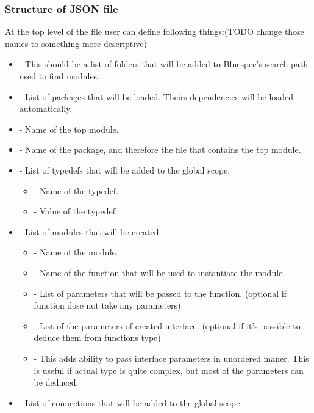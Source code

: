 \documentclass[14pt]{report}
\begin{document}
\subsubsection*{Structure of JSON file}
At the top level of the file user can define following things:(TODO change those names to something more descriptive)
\begin{itemize}
    \item {} - This should be a list of folders that will be added to Bluespec's search path used to find modules.
    \item {} - List of packages that will be loaded. Theirs dependencies will be loaded automatically.
    \item {} - Name of the top module.
    \item {} - Name of the package, and therefore the file that contains the top module.
    \item {} - List of typedefs that will be added to the global scope. \\
    \begin{itemize}
        \item {} - Name of the typedef.
        \item {} - Value of the typedef.
    \end{itemize}
    \item {} - List of modules that will be created. \\
    \begin{itemize}
        \item {} - Name of the module.
        \item {} - Name of the function that will be used to instantiate the module.
        \item {} - List of parameters that will be passed to the function. (optional if function dose not take any parameters)
        \item {} - List of the parameters of created interface. (optional if it's possible to deduce them from functions type)
        \item {} - This adds ability to pass interface parameters in unordered maner. This is useful if actual type is quite complex, but most of the parameters can be deduced.
    \end{itemize}
    \item {} - List of connections that will be added to the global scope. \\

\end{itemize}
\end{document}
